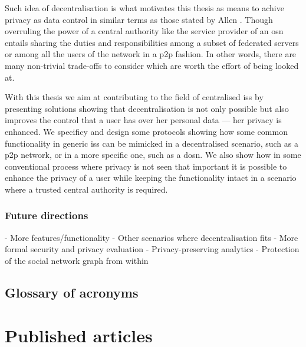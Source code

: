 \documentclass[showtrims,oldfontcommands]{kthesis}
\begin{document}
Such idea of decentralisation is what motivates this thesis as means to achive 
privacy as data control in similar terms as those stated by Allen \cite{Allen99}. 
Though overruling the power of a central authority like the service provider of 
an \ac{osn} entails sharing the duties and responsibilities among a subset of federated 
servers or among all the users of the network in a \ac{p2p} fashion. In other words, 
there are many non-trivial trade-offs to consider which are worth the effort of 
being looked at.

With this thesis we aim at contributing to the field of centralised \acp{is} by 
presenting solutions showing that decentralisation is not only possible but also 
improves the control that a user has over her personal data --- her privacy is enhanced. 
We specificy and design some protocols showing how some common functionality in 
generic \acp{is} can be mimicked in a decentralised scenario, such as a \ac{p2p} 
network, or in a more specific one, such as a \ac{dosn}. We also show how in some 
conventional process where privacy is not seen that important it is possible to 
enhance the privacy of a user while keeping the functionality intact in a scenario 
where a trusted central authority is required.




\section{Future directions}
    \label{section:future-directions}
- More features/functionality
- Other scenarios where decentralisation fits
- More formal security and privacy evaluation
- Privacy-preserving analytics
- Protection of the social network graph from within


\chapter{Glossary of acronyms}
\printacronyms


\part{Published articles}
    \label{part:published-articles}
\renewcommand\thechapter{\Alph{chapter}}
\renewcommand{\chaptername}{Article}
\end{document}
